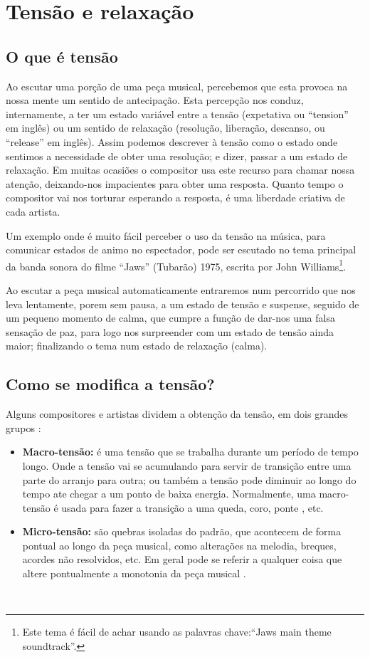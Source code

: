 \section{Tensão e relaxação }
\label{sec:tensionrelease}

\subsection{O que é tensão}
Ao escutar uma porção de uma peça musical, percebemos que esta provoca na nossa mente
um sentido de antecipação.
Esta percepção nos conduz, internamente, 
a ter um estado variável entre a tensão (expetativa ou ``tension'' em inglês)
ou um sentido de relaxação (resolução, liberação, descanso, ou ``release'' em inglês).
Assim podemos descrever à tensão como o 
estado onde sentimos a necessidade de obter uma resolução; e dizer, passar a um estado de relaxação.
Em muitas ocasiões o compositor usa este recurso para chamar nossa atenção,
deixando-nos impacientes para obter uma resposta. 
Quanto tempo o compositor vai nos torturar esperando a resposta, 
é uma liberdade criativa de cada artista.

\begin{example}
Um exemplo onde é muito fácil perceber o uso da tensão na música, 
para comunicar estados de animo no espectador, 
pode ser escutado no tema principal da banda sonora do filme ``Jaws'' (Tubarão) 1975,
escrita por John Williams\footnote{Este tema é fácil de achar usando as palavras chave:``Jaws main theme soundtrack''.}.

Ao escutar a peça musical automaticamente entraremos num percorrido que nos leva lentamente,
porem sem pausa, a um estado de tensão e suspense, seguido de um pequeno momento de calma,
que cumpre a função de dar-nos uma falsa sensação de paz,
 para logo nos surpreender com um estado de tensão ainda maior;
finalizando o tema num estado de relaxação (calma).
\end{example}

\subsection{Como se modifica a tensão?}

Alguns compositores e artistas dividem a obtenção da tensão, em dois grandes grupos \cite{edmtensionrelease1}:
\begin{itemize}
\item \textbf{Macro-tensão:}
é uma tensão que se trabalha durante um período de tempo longo. 
Onde a tensão vai se acumulando para servir de transição entre uma parte do arranjo para outra;
ou também a tensão pode diminuir ao longo do tempo ate chegar a um ponto de baixa energia.
Normalmente, uma macro-tensão é usada para fazer a transição a uma queda, coro, ponte \cite{edmtensionrelease1}, etc.
\item \textbf{Micro-tensão:}
são  quebras isoladas do padrão, que acontecem de forma pontual ao longo da peça musical, 
como alterações na melodia, breques, acordes não resolvidos, etc. 
Em geral pode se referir a qualquer coisa que altere pontualmente a monotonia da peça musical \cite{edmtensionrelease1}.
\end{itemize}~

